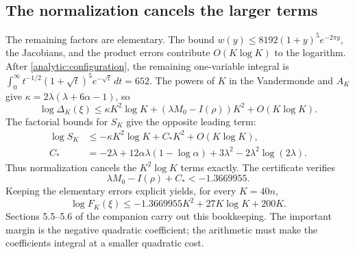 \subsection{The normalization cancels the larger terms}

The remaining factors are elementary. The bound
\(w(y)\le8192(1+y)^5e^{-2\pi y}\), the Jacobians, and the product
errors contribute \(O(K\log K)\) to the logarithm. After
\eqref{analytic:configuration}, the remaining one-variable integral is
\(\int_0^\infty t^{-1/2}(1+\sqrt t)^5e^{-\sqrt t}\,dt=652\).
The powers of \(K\) in the Vandermonde and \(A_K\) give
\(\kappa=2\lambda(\lambda+6\alpha-1)\), so
\[
 \log\Delta_K(\xi)
 \le\kappa K^2\log K+(\lambda M_0-I(\rho))K^2+O(K\log K).
\]
The factorial bounds for \(S_K\) give the opposite leading term:
\begin{align*}
 \log S_K&\le-\kappa K^2\log K+C_*K^2+O(K\log K),\\
 C_*&=-2\lambda+12\alpha\lambda(1-\log\alpha)
             +3\lambda^2-2\lambda^2\log(2\lambda).
\end{align*}
Thus normalization cancels the \(K^2\log K\) terms exactly. The
certificate verifies
\[
 \lambda M_0-I(\rho)+C_*<-1.3669955.
\]
Keeping the elementary errors explicit yields, for every \(K=40n\),
\begin{equation}\label{analytic:goal}
 \boxed{\ \log F_K(\xi)
 \le-1.3669955K^2+27K\log K+200K.\ }
\end{equation}
Sections 5.5--5.6 of the companion carry out this bookkeeping.
The important margin is the negative quadratic coefficient; the
arithmetic must make the coefficients integral at a smaller
quadratic cost.
